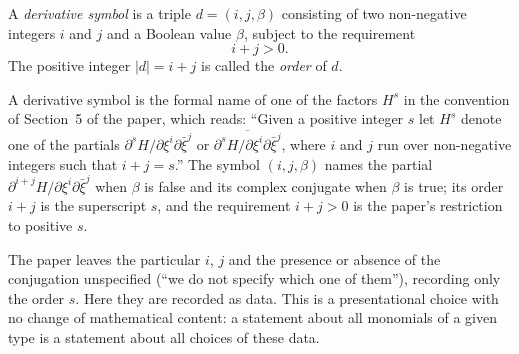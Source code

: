 \begin{definition}
A \emph{derivative symbol} is a triple $d=(i,j,\beta)$ consisting of two
non-negative integers $i$ and $j$ and a Boolean value $\beta$, subject to the
requirement
\[
  i+j>0 .
\]
The positive integer $|d|=i+j$ is called the \emph{order} of $d$.

A derivative symbol is the formal name of one of the factors $H^s$ in the
convention of Section~5 of the paper, which reads: ``Given a positive integer
$s$ let $H^s$ denote one of the partials
$\partial^sH/\partial\xi^i\partial\bar\xi^j$ or
$\overline{\partial^sH/\partial\xi^i\partial\bar\xi^j}$, where $i$ and $j$ run
over non-negative integers such that $i+j=s$.''  The symbol $(i,j,\beta)$
names the partial $\partial^{i+j}H/\partial\xi^i\partial\bar\xi^j$ when
$\beta$ is false and its complex conjugate when $\beta$ is true; its order
$i+j$ is the superscript $s$, and the requirement $i+j>0$ is the paper's
restriction to positive $s$.

The paper leaves the particular $i$, $j$ and the presence or absence of the
conjugation unspecified (``we do not specify which one of them''), recording
only the order $s$.  Here they are recorded as data.  This is a presentational
choice with no change of mathematical content: a statement about all
monomials of a given type is a statement about all choices of these data.
\end{definition}
